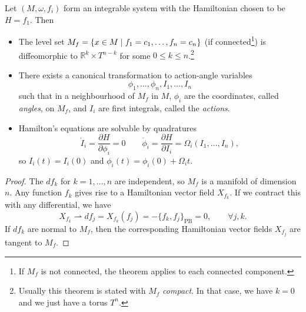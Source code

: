 \begin{theorem}
  Let $(M, \omega, f_i)$ form an integrable system with the Hamiltonian chosen to be $H = f_1$.
  Then
  \begin{itemize}
    \item The level set $M_f = \{x \in M \suchthat f_1 = c_1, \dots, f_n = c_n\}$ (if connected\footnote{If $M_f$ is not connected, the theorem applies to each connected component.}) is diffeomorphic to $\mathbb{R}^k \times T^{n-k}$ for some $0 \leq k \leq n$.\footnote{Usually this theorem is stated with $M_f$ \emph{compact}. In that case, we have $k = 0$ and we just have a torus $T^n$.}
    \item There exists a canonical transformation to action-angle variables
      \begin{equation}
        \phi_1, \dots, \phi_n, I_1, \dots, I_n
      \end{equation}
      such that in a neighbourhood of $M_f$ in $M$, $\phi_i$ are the coordinates, called \emph{angles}, on $M_f$, and $I_i$ are first integrals, called the \emph{actions}.
    \item Hamilton's equations are solvable by quadratures 
      \begin{equation}
	\dot{I}_i = \frac{\partial H}{\partial \phi_i} = 0 \qquad \dot{\phi}_i = \frac{\partial H}{\partial I_i} = \Omega_i (I_1, \dots, I_n),
      \end{equation}
      so $I_i(t) = I_i(0)$ and $\phi_i(t) = \phi_i(0) + \Omega_i t$.
  \end{itemize}
\end{theorem}
\begin{proof}
  The $d f_k$ for $k = 1, \dots, n$ are independent, so $M_f$ is a manifold of dimension $n$.
  Any function $f_k$ gives rise to a Hamiltonian vector field $X_{f_k}$. 
  If we contract this with any differential, we have
  \begin{equation}
    X_{f_k} \rightharpoonup d f_j = X_{f_k} (f_j) = - \{ f_k, f_j \}_{\text{PB}} = 0, \qquad \forall j,k.
  \end{equation}
  If $d f_k$ are normal to $M_f$, then the corresponding Hamiltonian vector fields $X_{f_j}$ are tangent to $M_f$.
\end{proof}
